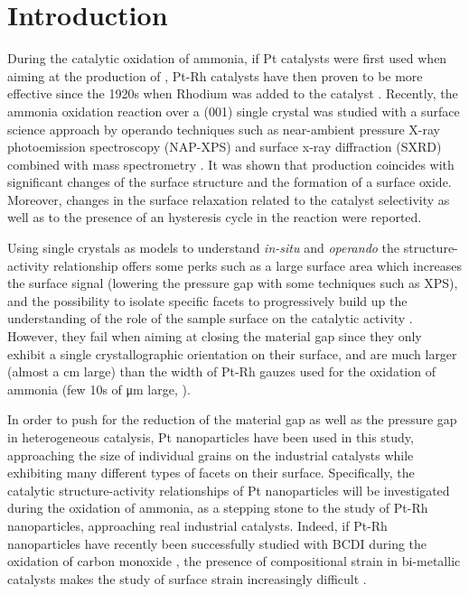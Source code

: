 \section{Introduction}

During the catalytic oxidation of ammonia, if Pt catalysts were first used when aiming at the production of , Pt-Rh catalysts have then proven to be more effective since the 1920s when Rhodium was added to the catalyst \parencite{Handforth1934, Heck1982}.
Recently, the ammonia oxidation reaction over a (001) single crystal was studied with a surface science approach by operando techniques such as near-ambient pressure X-ray photoemission spectroscopy (NAP-XPS) and surface x-ray diffraction (SXRD) combined with mass spectrometry \parencite{Resta2020a}.
It was shown that  production coincides with significant changes of the surface structure and the formation of a  surface oxide.
Moreover, changes in the surface relaxation related to the catalyst selectivity as well as to the presence of an hysteresis cycle in the reaction were reported.

Using single crystals as models to understand \textit{in-situ} and \textit{operando} the structure-activity relationship offers some perks such as a large surface area which increases the surface signal (lowering the pressure gap with some techniques such as XPS), and the possibility to isolate specific facets to progressively build up the understanding of the role of the sample surface on the catalytic activity \parencite{Hejral2016, Resta2020a}.
However, they fail when aiming at closing the material gap since they only exhibit a single crystallographic orientation on their surface, and are much larger (almost a \unit{cm} large) than the width of Pt-Rh gauzes used for the oxidation of ammonia (few 10s of \unit{\micro\meter} large, \cite{Kaiser1909}).

In order to push for the reduction of the material gap as well as the pressure gap in heterogeneous catalysis, Pt nanoparticles have been used in this study, approaching the size of individual grains on the industrial catalysts while exhibiting many different types of facets on their surface.
Specifically, the catalytic structure-activity relationships of Pt nanoparticles will be investigated during the oxidation of ammonia, as a stepping stone to the study of Pt-Rh nanoparticles, approaching real industrial catalysts.
Indeed, if Pt-Rh nanoparticles have recently been successfully studied with BCDI during the oxidation of carbon monoxide \parencite{Kim2021}, the presence of compositional strain in bi-metallic catalysts makes the study of surface strain increasingly difficult \parencite{Kawaguchi2019}.


